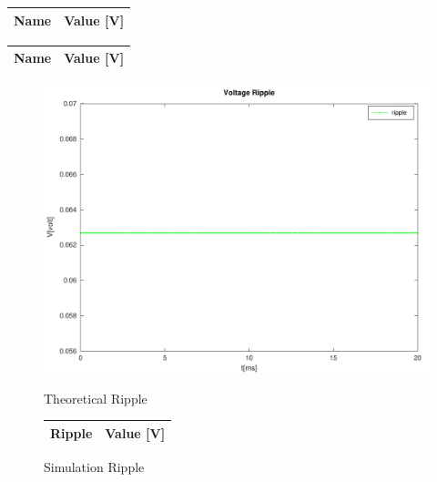 \begin{center}
  \begin{tabular}{ | c | c | }
    \hline    
    {\bf Name} & {\bf Value [V]} \\ \hline
    
    \hline
  \end{tabular}
\end{center}

\begin{center}
  \begin{tabular}{ | c | c | }
    \hline    
    {\bf Name} & {\bf Value [V]} \\ \hline
    
  \end{tabular}
\end{center}

\begin{figure}[H]
      \includegraphics[width=\linewidth]{../mat/ripple.pdf}
      \caption{Theoretical Ripple}
    \endminipage\hfill
      \centering
      \begin{tabular}{ | c | c | }
      \hline    
      {\bf Ripple} & {\bf Value [V]} \\ \hline
      
      \end{tabular}
      \caption{Simulation Ripple}
    \endminipage\hfill
\end{figure}

